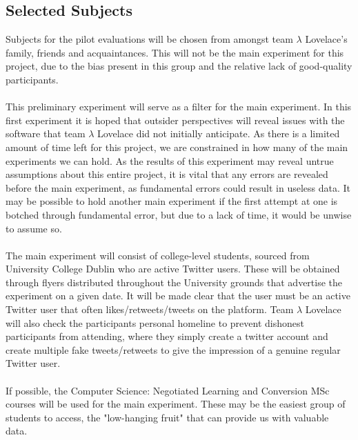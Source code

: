 \documentclass{article}
\begin{document}
\subsection{Selected Subjects}
%
%
Subjects for the pilot evaluations will be chosen from amongst team $\lambda$ Lovelace's family, friends and acquaintances. This will not be the main experiment for this project, due to the bias present in this group and the relative lack of good-quality participants.
\\\\
This preliminary experiment will serve as a filter for the main experiment. In this first experiment it is hoped that outsider perspectives will reveal issues with the software that team $\lambda$ Lovelace did not initially anticipate. As there is a limited amount of time left for this project, we are constrained in how many of the main experiments we can hold. As the results of this experiment may reveal untrue assumptions about this entire project, it is vital that any errors are revealed before the main experiment, as fundamental errors could result in useless data. It may be possible to hold another main experiment if the first attempt at one is botched through fundamental error, but due to a lack of time, it would be unwise to assume so. 
\\\\
The main experiment will consist of college-level students, sourced from University College Dublin who are active Twitter users. These will be obtained through flyers distributed throughout the University grounds that advertise the experiment on a given date. It will be made clear that the user must be an active Twitter user that often likes/retweets/tweets on the platform. Team $\lambda$ Lovelace will also check the participants personal homeline to prevent dishonest participants from attending, where they simply create a twitter account and create multiple fake tweets/retweets to give the impression of a genuine regular Twitter user.
\\\\
If possible, the Computer Science: Negotiated Learning and Conversion MSc courses will be used for the main experiment. These may be the easiest group of students to access, the "low-hanging fruit" that can provide us with valuable data.
\end{document}
